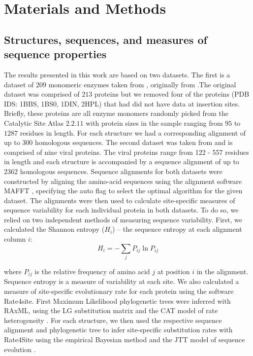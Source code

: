 \documentclass[12pt]{article}
\begin{document}
\section{Materials and Methods}
\label{sec:mam}

    \subsection*{Structures, sequences, and measures of sequence properties } 
    The results presented in this work are based on two datasets. The first is a dataset of $209$ monomeric enzymes taken from \cite{Huangetal2014}, originally from \cite{Yehetal2014a}.The original dataset was comprised of $213$ proteins but we removed four of the proteins (PDB IDS: 1BBS, 1BS0, 1DIN, 2HPL) that had did not have data at insertion sites. Briefly, these proteins are all enzyme monomers   randomly picked from the Catalytic Site Atlas $2.2.11$ \citep{Porteretal2004} with protein sizes in the sample ranging from $95$ to $1287$ residues in length. For each structure we had a corresponding alignment of up to 300 homologous sequences.  The second dataset was taken from \cite{Shahmoradietal2014} and is comprised of nine viral proteins. The viral proteins range from 122 - 557 residues in length and each structure is accompanied by a sequence alignment of up to 2362 homologous sequences. Sequence alignments for both datasets were constructed by aligning the amino-acid sequences using the alignment software MAFFT \citep{Katohetal2002, Katohetal2005}, specifying the auto flag to select the optimal algorithm for the given dataset. The alignments were then used to calculate site-specific measures of sequence variability for each individual protein in both datasets. To do so, we relied on two independent methods of measuring sequence variability. First, we calculated the Shannon entropy ($H_i$) -- the sequence entropy at each alignment column $i$:
    \begin{equation}
        \label{eqn:shannon}
        H_i = -\sum_j P_{ij}\ln P_{ij}
    \end{equation}

    where $P_{ij}$ is the relative frequency of amino acid $j$ at position $i$ in the alignment. Sequence entropy is a measure of variability at each site. We also calculated a measure of site-specific evolutionary rate for each protein using the software Rate4site. First Maximum Likelihood phylogenetic trees were inferred with RAxML, using the LG substitution matrix and the CAT model of rate heterogeneity \citep{Stamatakis2006, Stamatakis2014}. For each structure, we then used the respective sequence alignment and phylogenetic tree to infer site-specific substitution rates with Rate4Site using the empirical Bayesian method and the JTT model of sequence evolution \citep{Mayroseetal2004}.
\end{document}

